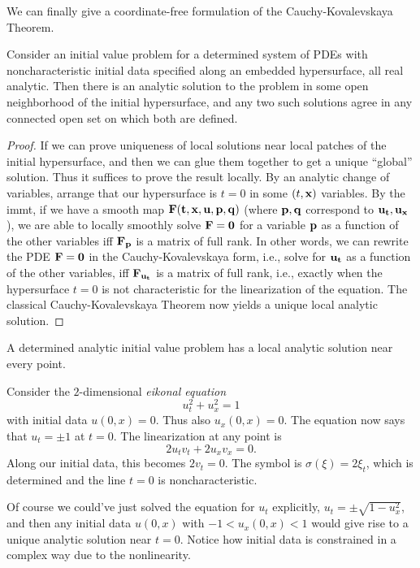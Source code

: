 We can finally give a coordinate-free formulation of the Cauchy-Kovalevskaya Theorem.

\begin{thm}
    Consider an initial value problem for a determined system of PDEs with noncharacteristic initial data specified along an embedded hypersurface, all real analytic. Then there is an analytic solution to the problem in some open neighborhood of the initial hypersurface, and any two such solutions agree in any connected open set on which both are defined.
\end{thm}
\begin{proof}
    If we can prove uniqueness of local solutions near local patches of the initial hypersurface, and then we can glue them together to get a unique ``global'' solution. Thus it suffices to prove the result locally. By an analytic change of variables, arrange that our hypersurface  is $t=0$ in some $(t,\bf{x})$ variables. By the \gls{immt}, if we have a smooth map $\bf{F}(t,\bf{x},\bf{u},\bf{p},\bf{q})$ (where $\bf{p},\bf{q}$ correspond to $\bf{u}_t,\bf{u}_{\bf x}$), we are able to locally smoothly solve $\bf{F}=0$ for a variable $\bf{p}$ as a function of the other variables iff $\bf{F}_{\bf{p}}$ is a matrix of full rank. In other words, we can rewrite the PDE $\bf{F}=0$ in the Cauchy-Kovalevskaya form, i.e., solve for $\bf{u}_t$ as a function of the other variables, iff $\bf{F}_{\bf{u}_t}$ is a matrix of full rank, i.e., exactly when the hypersurface $t=0$ is not characteristic for the linearization of the equation. The classical Cauchy-Kovalevskaya Theorem now yields a unique local analytic solution.
\end{proof}
\begin{cor}
    A determined analytic initial value problem has a local analytic solution near every point.
\end{cor}

\begin{example}
    Consider the $2$-dimensional \emph{eikonal equation} 
    \[u_t^2+u_x^2=1\]
    with initial data $u(0,x)=0$. Thus also $u_x(0,x)=0$. The equation now says that $u_t=\pm 1$ at $t=0$. The linearization at any point is 
    \[2u_t v_t+2u_x v_x=0.\]
    Along our initial data, this becomes $2v_t=0$. The symbol is $\sigma(\xi)=2\xi_t$, which is determined and the line $t=0$ is noncharacteristic. 

    Of course we could've just solved the equation for $u_t$ explicitly, $u_t=\pm \sqrt{1-u_x^2}$, and then any initial data $u(0,x)$ with $-1<u_x(0,x)<1$ would give rise to a unique analytic solution near $t=0$. Notice how initial data is constrained in a complex way due to the nonlinearity.
\end{example}

